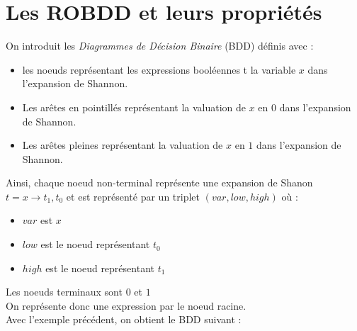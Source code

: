 \documentclass[a4paper, oneside]{report}
\begin{document}
\section{Les ROBDD et leurs propriétés}

On introduit les \textit{Diagrammes de Décision Binaire} (BDD) définis avec :
\begin{itemize}
\item les noeuds représentant les expressions booléennes t la variable $x$ dans l'expansion de Shannon.
\item Les arêtes en pointillés représentant la valuation de $x$ en $0$ dans l'expansion de Shannon.
\item Les arêtes pleines représentant la valuation de $x$ en $1$ dans l'expansion de Shannon.
\end{itemize}

Ainsi, chaque noeud non-terminal représente une expansion de Shanon $ t = x \rightarrow t_1, t_0 $ et est représenté par un triplet $(var, low, high)$ où :
\begin{itemize}
\item $var$ est $x$
\item $low$ est le noeud représentant $t_0$
\item $high$ est le noeud représentant $t_1$
\end{itemize}

Les noeuds terminaux sont $0$ et $1$\\

On représente donc une expression par le noeud racine.\\

Avec l'exemple précédent, on obtient le BDD suivant :

\newcommand{\largeur}{0.5\linewidth}
\end{document}
